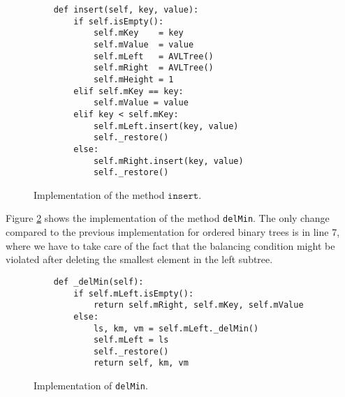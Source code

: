 \begin{figure}[!ht]
\centering
\begin{verbatim}
    def insert(self, key, value):
        if self.isEmpty():
            self.mKey    = key
            self.mValue  = value
            self.mLeft   = AVLTree()
            self.mRight  = AVLTree()
            self.mHeight = 1
        elif self.mKey == key:
            self.mValue = value
        elif key < self.mKey:
            self.mLeft.insert(key, value)
            self._restore()
        else:
            self.mRight.insert(key, value)
            self._restore()
\end{verbatim}
\vspace*{-0.3cm}
\caption{Implementation of the method $\texttt{insert}$.}
\label{fig:avl-tree.ipython:insert}
\end{figure}

Figure \ref{fig:avl-tree.ipython:delMin} shows the implementation of the method \texttt{delMin}.
The only change compared to the previous implementation for ordered binary trees is in line 7, where
we have to take care of the fact that the balancing condition might be violated after deleting the
smallest element in the left subtree.

\begin{figure}[!ht]
\centering
\begin{verbatim}
    def _delMin(self):
        if self.mLeft.isEmpty():
            return self.mRight, self.mKey, self.mValue
        else:
            ls, km, vm = self.mLeft._delMin()
            self.mLeft = ls
            self._restore()
            return self, km, vm
\end{verbatim}
\vspace*{-0.3cm}
\caption{Implementation of \texttt{delMin}.}
\label{fig:avl-tree.ipython:delMin}
\end{figure}


